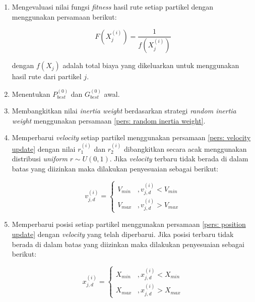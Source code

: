 {{\begin{enumerate}[align = left, left = 0cm, nolistsep]
        \item Mengevaluasi nilai fungsi \textit{fitness} hasil rute setiap partikel dengan menggunakan persamaan berikut:

              \begin{equation}
                  \label{pers: nilai fungsi fitness}
                  F(X_{j}^{(i)}) = \frac{1}{f(X_{j}^{(i)})}
              \end{equation}

              dengan $f(X_{j})$ adalah total biaya yang dikeluarkan untuk menggunakan hasil rute dari partikel $j$.
        \item Menentukan $P_{best}^{(0)}$ dan $G_{best}^{(0)}$ awal.
        \item Membangkitkan nilai \textit{inertia weight} berdasarkan strategi \textit{random inertia weight} menggunakan persamaan \ref{pers: random inertia weight}.
        \item Memperbarui \textit{velocity} setiap partikel menggunakan persamaan \ref{pers: velocity update} dengan nilai $r_{1}^(i)$ dan $r_{2}^(i)$ dibangkitkan secara acak menggunakan distribusi \textit{uniform} $r\sim U(0,1)$.
              Jika \textit{velocity} terbaru tidak berada di dalam batas yang diizinkan maka dilakukan penyesuaian sebagai berikut:

              \begin{equation}
                  v_{j,d}^{(i)} = \begin{cases} V_{min} &, v_{j,d}^{(i)} < V_{min} \\ V_{max} &, v_{j,d}^{(i)} > V_{max} \end{cases}
                  \label{pers: penyesuaian velocity}
              \end{equation}

        \item Memperbarui posisi setiap partikel menggunakan persamaan \ref{pers: position update} dengan \textit{velocity} yang telah diperbarui.
              Jika posisi terbaru tidak berada di dalam batas yang diizinkan maka dilakukan penyesuaian sebagai berikut:

              \begin{equation}
                  x_{j,d}^{(i)} = \begin{cases} X_{min} &, x_{j,d}^{(i)} < X_{min} \\ X_{max} &, x_{j,d}^{(i)} > X_{max} \end{cases}
                  \label{pers: penyesuaian posisi}
              \end{equation}


\end{enumerate}}}
